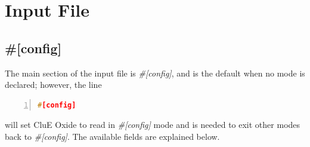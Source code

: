 \documentclass{book}
\begin{document}
\section{Input File}
\subsection{\#[config]}
The main section of the input file is \textit{\#[config]}, and is the default
when no mode is declared; however, the line
\begin{lstlisting}[frame=single,numbers=left,language=c]
#[config]
\end{lstlisting}
will set CluE Oxide to read in \textit{\#[config]} mode and is needed to exit
other modes back to \textit{\#[config]}.
The available fields are explained below.  
\end{document}
